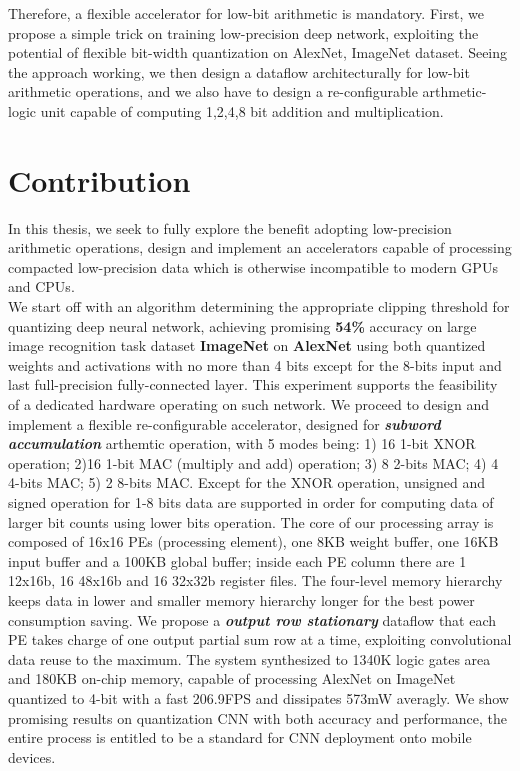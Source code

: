 Therefore, a flexible accelerator for low-bit arithmetic is mandatory. First, we propose a simple trick on training low-precision deep network, exploiting the potential of flexible bit-width quantization on AlexNet, ImageNet dataset. Seeing the approach working, we then design a dataflow architecturally for low-bit arithmetic operations, and we also have to design a re-configurable arthmetic-logic unit capable of computing 1,2,4,8 bit addition and multiplication. 

\section{Contribution}
In this thesis, we seek to fully explore the benefit adopting low-precision arithmetic operations, design and implement an accelerators capable of processing compacted low-precision data which is otherwise incompatible to modern GPUs and CPUs. \\
We start off with an algorithm determining the appropriate clipping threshold for quantizing deep neural network, achieving promising \textbf{54\%} accuracy on large image recognition task dataset \textbf{ImageNet}\cite{ImageNet} on \textbf{AlexNet}\cite{AlexNet} using both quantized weights and activations with no more than 4 bits except for the 8-bits input and last full-precision fully-connected layer. This experiment supports the feasibility of a dedicated hardware operating on such network. We proceed to design and implement a flexible re-configurable accelerator, designed for \textbf{\textit{subword accumulation}} arthemtic operation, with 5 modes being: 1) 16 1-bit XNOR operation; 2)16 1-bit MAC (multiply and add) operation; 3) 8 2-bits MAC; 4) 4 4-bits MAC; 5) 2 8-bits MAC. Except for the XNOR operation, unsigned and signed operation for 1-8 bits data are supported in order for computing data of larger bit counts using lower bits operation. The core of our processing array is composed of 16x16 PEs (processing element), one 8KB weight buffer, one 16KB input buffer and a 100KB global buffer; inside each PE column there are 1 12x16b, 16 48x16b and 16 32x32b register files. The four-level memory hierarchy keeps data in lower and smaller memory hierarchy longer for the best power consumption saving. We propose a \textbf{\textit{output row stationary}} dataflow that each PE takes charge of one output partial sum row at a time, exploiting convolutional data reuse to the maximum. The system synthesized to 1340K logic gates area and 180KB on-chip memory, capable of processing AlexNet on ImageNet quantized to 4-bit with a fast 206.9FPS and dissipates 573mW averagly. We show promising results on quantization CNN with both accuracy and performance, the entire process is entitled to be a standard for CNN deployment onto mobile devices. \\

